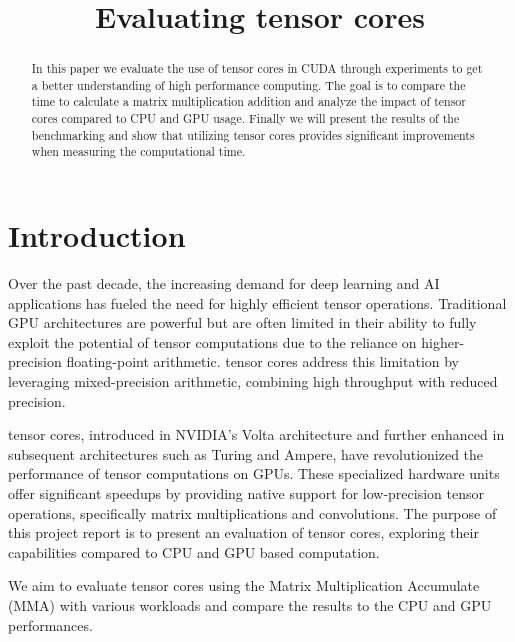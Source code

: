 \documentclass[conference]{IEEEtran}
\begin{document}
\title{Evaluating tensor cores}


\author{
}

\maketitle

\begin{abstract}\label{sec:abstract}
In this paper we evaluate the use of tensor cores in CUDA through experiments to get a better 
understanding of high performance computing. The goal is to compare the time 
to calculate a matrix multiplication addition and analyze the impact of tensor cores compared to CPU and GPU
usage. Finally we will present the results of the benchmarking and show that utilizing tensor cores 
provides significant improvements when measuring the computational time.

\end{abstract}

\section{Introduction}\label{sec:intro}


Over the past decade, the increasing demand for deep learning and AI applications has
fueled the need for highly efficient tensor operations. Traditional GPU architectures are powerful but 
are often limited in their ability to fully exploit the potential of 
tensor computations due to the reliance on higher-precision floating-point arithmetic. 
tensor cores address this limitation by leveraging mixed-precision arithmetic, combining 
high throughput with reduced precision.

tensor cores, introduced in NVIDIA's Volta architecture and further enhanced in 
subsequent architectures such as Turing and Ampere, have revolutionized the performance of 
tensor computations on GPUs. These specialized hardware units offer significant speedups 
by providing native support for low-precision tensor operations, 
specifically matrix multiplications and convolutions. 
The purpose of this project report is to present an evaluation of tensor cores,
exploring their capabilities compared to CPU and GPU based computation.

We aim to evaluate tensor cores using the Matrix Multiplication Accumulate (MMA) with various 
workloads and compare the results to the CPU and GPU performances. 
\end{document}
